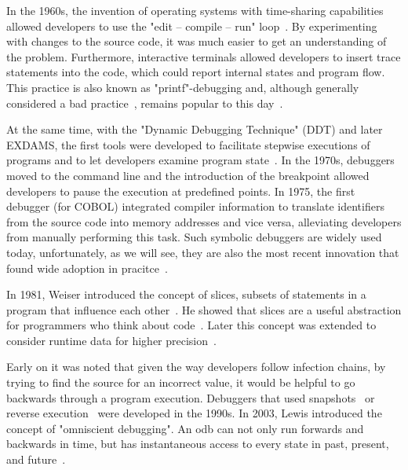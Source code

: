 \newpage
In the 1960s, the invention of operating systems with time-sharing capabilities allowed developers to use the "edit -- compile -- run" loop~\cite{linton90:the_evolution_of_dbx}.
By experimenting with changes to the source code, it was much easier to get an understanding of the problem.
Furthermore, interactive terminals allowed developers to insert trace statements into the code, which could report internal states and program flow.
This practice is also known as "printf"-debugging and, although generally considered a bad practice~\cite{zeller09:why_programs_fail}, remains popular to this day~\cite{perscheid17:studying_the_advancement}.

At the same time, with the "Dynamic Debugging Technique" (DDT) and later EXDAMS, the first tools were developed to facilitate stepwise executions of programs and to let developers examine program state~\cite{balzer69:exdams_extendable_debugging}.
In the 1970s, debuggers moved to the command line and the introduction of the breakpoint allowed developers to pause the execution at predefined points.
In 1975, the first debugger (for COBOL) integrated compiler information to translate identifiers from the source code into memory addresses and vice versa, alleviating developers from manually performing this task.
Such symbolic debuggers are widely used today, unfortunately, as we will see, they are also the most recent innovation that found wide adoption in pracitce~\cite{perscheid17:studying_the_advancement}.

In 1981, Weiser introduced the concept of slices, subsets of statements in a program that influence each other~\cite{weiser81:program_slicing}. 
He showed that slices are a useful abstraction for programmers who think about code~\cite{weiser82:programmers_use_slices_when}.
Later this concept was extended to consider runtime data for higher precision~\cite{agrawal90:dynamic_program_slicing, korel90:dynamic_slicing_of_computer}.

Early on it was noted that given the way developers follow infection chains, by trying to find the source for an incorrect value, it would be helpful to go backwards through a program execution.
Debuggers that used snapshots~\cite{feldman88:igor_a_system} or reverse execution~\cite{lieberman95:zstep_95_a_reversible} were developed in the 1990s.
In 2003, Lewis introduced the concept of "omniscient debugging".
An \ac{odb} can not only run forwards and backwards in time, but has instantaneous access to every state in past, present, and future~\cite{lewis03:debugging_backwards_in_time}.

